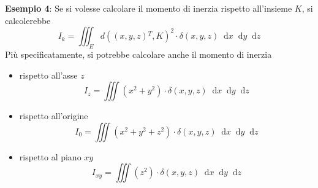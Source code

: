 \documentclass[a4paper]{extarticle}
\newcommand*\dif{\mathop{}\!\mathrm{d}}
\begin{document}
\vspace{2em}
\noindent
\textbf{Esempio 4}: Se si volesse calcolare il momento di inerzia rispetto all'insieme $K$, si calcolerebbe
\[I_k = \iiint_E d((x,y,z){^T},K)^2 \cdot \delta(x,y,z) \dif x \dif y \dif z\]
Più specificatamente, si potrebbe calcolare anche il momento di inerzia
\begin{itemize}
    \item rispetto all'asse $z$
    \[I_z=\iiint (x^2+y^2) \cdot \delta(x,y,z) \dif x \dif y \dif z\]
    \item rispetto all'origine
    \[I_0=\iiint (x^2+y^2+z^2) \cdot \delta(x,y,z) \dif x \dif y \dif z\]
    \item rispetto al piano $xy$
    \[I_{xy}=\iiint (z^2) \cdot \delta(x,y,z) \dif x \dif y \dif z\]
\end{itemize}
\end{document}
